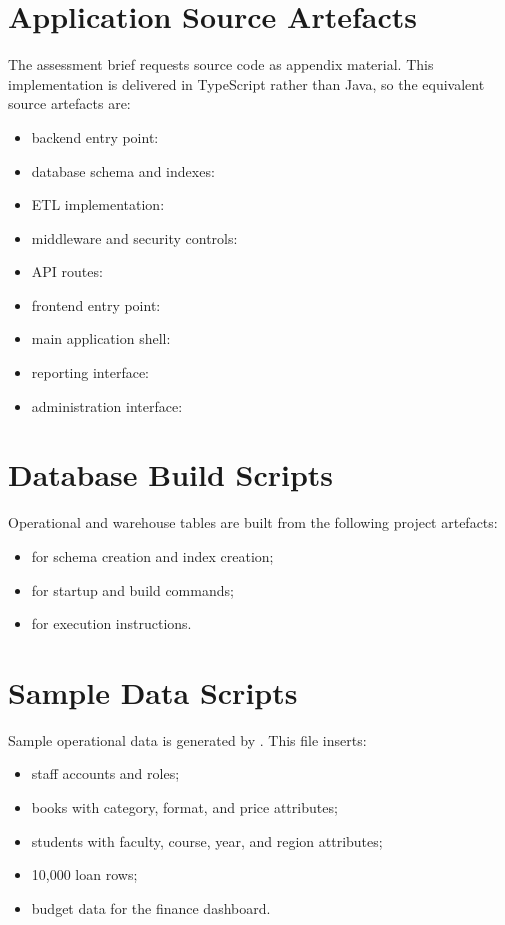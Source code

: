 \documentclass[12pt,a4paper]{article}
\begin{document}
\section{Application Source Artefacts}
The assessment brief requests source code as appendix material. This implementation is delivered in TypeScript rather than Java, so the equivalent source artefacts are:
\begin{itemize}
  \item backend entry point: 
  \item database schema and indexes: 
  \item ETL implementation: 
  \item middleware and security controls: 
  \item API routes: 
  \item frontend entry point: 
  \item main application shell: 
  \item reporting interface: 
  \item administration interface: 
\end{itemize}

\section{Database Build Scripts}
Operational and warehouse tables are built from the following project artefacts:
\begin{itemize}
  \item {} for schema creation and index creation;
  \item {} for startup and build commands;
  \item {} for execution instructions.
\end{itemize}

\section{Sample Data Scripts}
Sample operational data is generated by . This file inserts:
\begin{itemize}
  \item staff accounts and roles;
  \item books with category, format, and price attributes;
  \item students with faculty, course, year, and region attributes;
  \item 10,000 loan rows;
  \item budget data for the finance dashboard.
\end{itemize}
\end{document}

